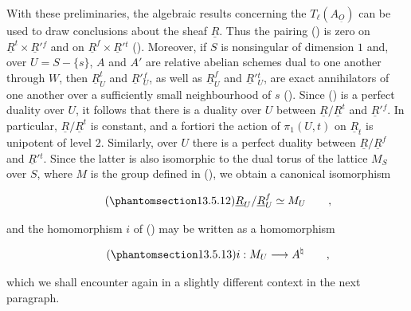 \noindent
With these preliminaries, the algebraic results concerning the
$T_\ell(A_{\underline O})$ can be used to draw conclusions about the
sheaf $\underline R$.  Thus the pairing () is zero on
$\underline R^t\times\underline R'{}^f$ and on
$\underline R^f\times\underline R'{}^t$ ().  Moreover, if $S$ is
nonsingular of dimension $1$ and, over $U=S-\{s\}$, $A$ and $A'$ are
relative abelian schemes dual to one another through $W$, then
$\underline R^t_U$ and $\underline R'{}^f_U$, as well as
$\underline R^f_U$ and $\underline R'{}^t_U$, are exact annihilators of
one another over a sufficiently small neighbourhood of $s$ ().
Since () is a perfect duality over $U$, it follows that there is
a duality over $U$ between $\underline R/\underline R^t$ and
$\underline R'{}^f$.  In particular,
$\underline R/\underline R^t$ is constant, and a fortiori the action of
$\pi_1(U,t)$ on $\underline R_t$ is unipotent of level $2$.  Similarly,
over $U$ there is a perfect duality between
$\underline R/\underline R^f$ and $\underline R'{}^t$.  Since the
latter is also isomorphic to the dual torus of the lattice $M_S$ over
$S$, where $M$ is the group defined in (), we obtain a canonical
isomorphism

\begin{equation}\tag{\SGARefTarget{sga7.sga7i.eix.n13-5-12}{13.5.12}}
 \underline R_U/\underline R^f_U\simeq M_U
 \qquad ,
\end{equation}

\noindent
and the homomorphism $i$ of () may be written as a homomorphism

\begin{equation}\tag{\SGARefTarget{sga7.sga7i.eix.n13-5-13}{13.5.13}}
 i:M_U\longrightarrow A^\natural
 \qquad ,
\end{equation}

\noindent
which we shall encounter again in a slightly different context in the
next paragraph.
